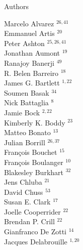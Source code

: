 \documentclass[PICOReport.tex]{subfiles}
\begin{document}
\Large  {\centerline {Authors}}
%
\footnotesize {
\begin{multicols}{4}
Marcelo Alvarez $^{26,41}$                 \\
Emmanuel Artis $^{20}$                  \\
Peter Ashton $^{25,26,41}$                    \\
Jonathan Aumont $^{19}$                 \\
Ranajoy Banerji $^{49}$                 \\
R. Belen Barreiro $^{18}$               \\
James G. Bartlett $^{1,22}$               \\
Soumen Basak $^{34}$                    \\
Nick Battaglia $^{8}$                  \\
Jamie Bock $^{2,22}$                      \\
Kimberly K. Boddy $^{23}$               \\
Matteo Bonato $^{13}$                   \\
Julian Borrill $^{26,37}$                  \\
Fran\c{c}ois Bouchet $^{15}$            \\
Fran\c{c}ois Boulanger $^{10}$          \\
Blakesley Burkhart $^{32}$              \\
Jens Chluba $^{21}$                     \\
David Chuss $^{53}$                     \\
Susan E. Clark $^{17}$                  \\
Joelle Cooperrider $^{22}$              \\
Brendan P. Crill $^{22}$                \\
Gianfranco De Zotti $^{14}$             \\
Jacques Delabrouille $^{1,20}$            \\

\end{multicols}}
\end{document}
